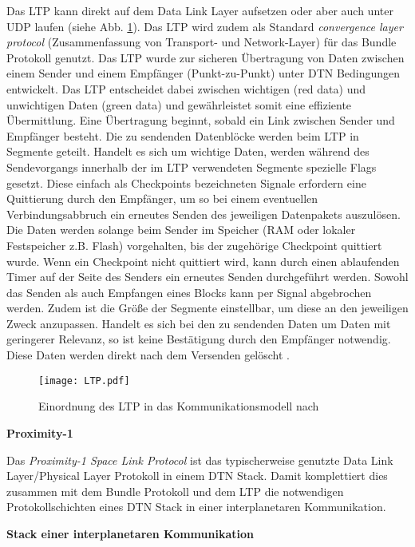 Das \gls{LTP} kann direkt auf dem Data Link Layer
aufsetzen oder aber auch unter \gls{UDP} laufen (siehe Abb. \ref{fig:LTP}). Das \gls{LTP}
wird zudem als Standard \textit{convergence layer protocol} (Zusammenfassung von
Transport- und Network-Layer) f{\"u}r das Bundle Protokoll genutzt. Das \gls{LTP}
wurde zur sicheren {\"U}bertragung von Daten zwischen einem Sender und einem
Empf{\"a}nger (Punkt-zu-Punkt) unter \gls{DTN} Bedingungen entwickelt. Das \gls{LTP}
entscheidet dabei zwischen wichtigen (red data) und unwichtigen Daten (green
data) und gew{\"a}hrleistet somit eine effiziente {\"U}bermittlung. Eine
{\"U}bertragung beginnt, sobald ein Link zwischen Sender und Empf{\"a}nger
besteht. Die zu sendenden Datenbl{\"o}cke werden beim \gls{LTP} in Segmente geteilt.
Handelt es sich um wichtige Daten, werden w{\"a}hrend des Sendevorgangs
innerhalb der im \gls{LTP} verwendeten Segmente spezielle Flags gesetzt.
Diese einfach als Checkpoints bezeichneten Signale erfordern eine Quittierung
durch den Empf{\"a}nger, um so bei einem eventuellen Verbindungsabbruch ein
erneutes Senden des jeweiligen Datenpakets auszul{\"o}sen. Die Daten werden
solange beim Sender im Speicher (RAM oder lokaler Festspeicher z.B. Flash)
vorgehalten, bis der zugeh{\"o}rige Checkpoint quittiert wurde. Wenn ein Checkpoint nicht quittiert wird, kann durch
einen ablaufenden Timer auf der Seite des Senders ein erneutes Senden
durchgeführt werden. Sowohl das Senden als auch Empfangen eines Blocks kann per
Signal abgebrochen werden. Zudem ist die Gr{\"o}{\ss}e der Segmente einstellbar,
um diese an den jeweiligen Zweck anzupassen. Handelt es sich bei den zu sendenden
Daten um Daten mit geringerer Relevanz, so ist keine Best{\"a}tigung durch den
Empf{\"a}nger notwendig.
Diese Daten werden direkt nach dem Versenden gel{\"o}scht \cite{web4}.

\begin{figure}[H]
\centering
\texttt{[image: LTP.pdf]}
\caption{Einordnung des LTP in das Kommunikationsmodell nach \cite{Burleigh}}
\label{fig:LTP}
\end{figure}

\textbf{Proximity-1}

Das \textit{Proximity-1 Space Link Protocol} ist das typischerweise genutzte
Data Link Layer/Physical Layer Protokoll in einem \gls{DTN} Stack. Damit komplettiert
dies zusammen mit dem Bundle Protokoll und dem \gls{LTP} die notwendigen
Protokollschichten eines \gls{DTN} Stack in einer interplanetaren Kommunikation.

\textbf{Stack einer interplanetaren Kommunikation}

